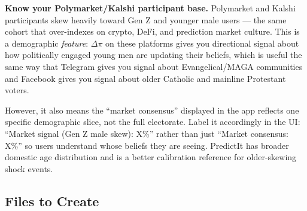 \documentclass[11pt]{article}
\begin{document}
\begin{mdframed}[style=warnbox]
\textbf{Know your Polymarket/Kalshi participant base.}
Polymarket and Kalshi participants skew heavily toward Gen Z and younger male users ---
the same cohort that over-indexes on crypto, DeFi, and prediction market culture.
This is a demographic \emph{feature}: $\Delta\pi$ on these platforms gives you
directional signal about how politically engaged young men are updating their
beliefs, which is useful the same way that Telegram gives you signal about Evangelical/MAGA communities
and Facebook gives you signal about older Catholic and mainline Protestant voters.

However, it also means the ``market consensus'' displayed in the app reflects one
specific demographic slice, not the full electorate. Label it accordingly in the UI:
``Market signal (Gen Z male skew): X\%'' rather than just ``Market consensus: X\%''
so users understand whose beliefs they are seeing. PredictIt has broader domestic
age distribution and is a better calibration reference for older-skewing shock events.
\end{mdframed}

\subsection*{Files to Create}
\end{document}
